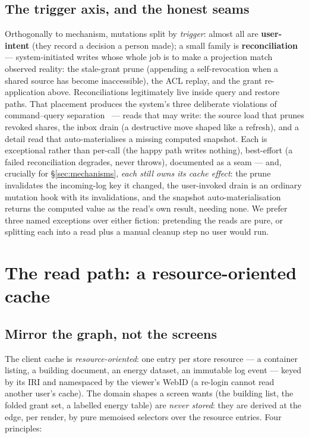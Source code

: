 \documentclass[11pt,a4paper]{article}
\theoremstyle{remark}
\begin{document}
\subsection{The trigger axis, and the honest seams}\label{sec:triggers}

Orthogonally to mechanism, mutations split by \emph{trigger}: almost all are
\textbf{user-intent} (they record a decision a person made); a small family is
\textbf{reconciliation} --- system-initiated writes whose whole job is to make a
projection match observed reality: the stale-grant prune (appending a
self-revocation when a shared source has become inaccessible), the ACL replay,
and the grant re-application above. Reconciliations legitimately live inside
query and restore paths. That placement produces the system's three deliberate
violations of command--query separation~\cite{meyer} --- reads that may write:
the source load that prunes revoked shares, the inbox drain (a destructive move
shaped like a refresh), and a detail read that auto-materialises a missing
computed snapshot. Each is exceptional rather than per-call (the happy path
writes nothing), best-effort (a failed reconciliation degrades, never throws),
documented as a seam --- and, crucially for \S\ref{sec:mechanisms},
\emph{each still owns its cache effect}: the prune invalidates the
incoming-log key it changed, the user-invoked drain is an ordinary mutation
hook with its invalidations, and the snapshot auto-materialisation returns the
computed value as the read's own result, needing none. We prefer three named exceptions over either fiction:
pretending the reads are pure, or splitting each into a read plus a manual
cleanup step no user would run.

\section{The read path: a resource-oriented cache}\label{sec:reads}

\subsection{Mirror the graph, not the screens}\label{sec:normalised}

The client cache is \emph{resource-oriented}: one entry per store resource --- a
container listing, a building document, an energy dataset, an immutable log
event --- keyed by its IRI and namespaced by the viewer's WebID (a re-login
cannot read another user's cache). The domain shapes a screen wants (the building
list, the folded grant set, a labelled energy table) are \emph{never stored}:
they are derived at the edge, per render, by pure memoised selectors over the
resource entries. Four principles:
\end{document}
